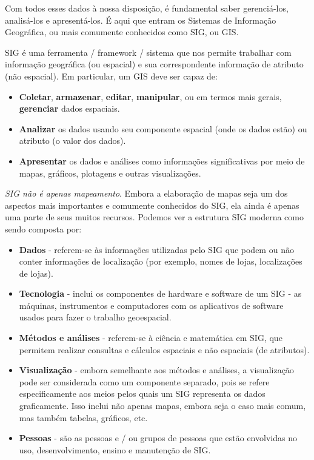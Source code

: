 \documentclass[
]{krantz}
\providecommand{\tightlist}{%
  \setlength{\itemsep}{0pt}\setlength{\parskip}{0pt}}
\begin{document}
Com todos esses dados à nossa disposição, é fundamental saber gerenciá-los, analisá-los e apresentá-los. É aqui que entram os Sistemas de Informação Geográfica, ou mais comumente conhecidos como SIG, ou GIS.

SIG é uma ferramenta / framework / sistema que nos permite trabalhar com informação geográfica (ou espacial) e sua correspondente informação de atributo (não espacial). Em particular, um GIS deve ser capaz de:

\begin{itemize}
\tightlist
\item
  \textbf{Coletar}, \textbf{armazenar}, \textbf{editar}, \textbf{manipular}, ou em termos mais gerais, \textbf{gerenciar} dados espaciais.
\item
  \textbf{Analizar} os dados usando seu componente espacial (onde os dados estão) ou atributo (o valor dos dados).
\item
  \textbf{Apresentar} os dados e análises como informações significativas por meio de mapas, gráficos, plotagens e outras visualizações.
\end{itemize}

\emph{SIG não é apenas mapeamento}. Embora a elaboração de mapas seja um dos aspectos mais importantes e comumente conhecidos do SIG, ela ainda é apenas uma parte de seus muitos recursos. Podemos ver a estrutura SIG moderna como sendo composta por:

\begin{itemize}
\tightlist
\item
  \textbf{Dados} - referem-se às informações utilizadas pelo SIG que podem ou não conter informações de localização (por exemplo, nomes de lojas, localizações de lojas).
\item
  \textbf{Tecnologia} - inclui os componentes de hardware e software de um SIG - as máquinas, instrumentos e computadores com os aplicativos de software usados para fazer o trabalho geoespacial.
\item
  \textbf{Métodos e análises} - referem-se à ciência e matemática em SIG, que permitem realizar consultas e cálculos espaciais e não espaciais (de atributos).
\item
  \textbf{Visualização} - embora semelhante aos métodos e análises, a visualização pode ser considerada como um componente separado, pois se refere especificamente aos meios pelos quais um SIG representa os dados graficamente. Isso inclui não apenas mapas, embora seja o caso mais comum, mas também tabelas, gráficos, etc.
\item
  \textbf{Pessoas} - são as pessoas e / ou grupos de pessoas que estão envolvidas no uso, desenvolvimento, ensino e manutenção de SIG.
\end{itemize}
\end{document}
